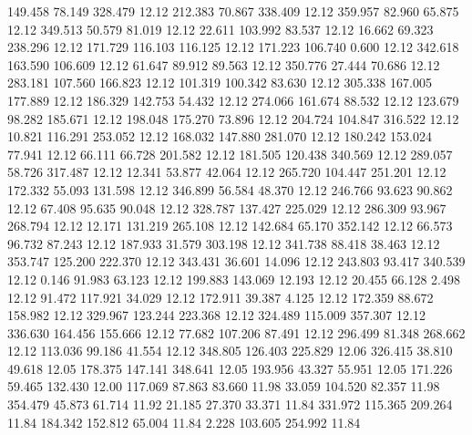  149.458   78.149  328.479        12.12
 212.383   70.867  338.409        12.12
 359.957   82.960   65.875        12.12
 349.513   50.579   81.019        12.12
  22.611  103.992   83.537        12.12
  16.662   69.323  238.296        12.12
 171.729  116.103  116.125        12.12
 171.223  106.740    0.600        12.12
 342.618  163.590  106.609        12.12
  61.647   89.912   89.563        12.12
 350.776   27.444   70.686        12.12
 283.181  107.560  166.823        12.12
 101.319  100.342   83.630        12.12
 305.338  167.005  177.889        12.12
 186.329  142.753   54.432        12.12
 274.066  161.674   88.532        12.12
 123.679   98.282  185.671        12.12
 198.048  175.270   73.896        12.12
 204.724  104.847  316.522        12.12
  10.821  116.291  253.052        12.12
 168.032  147.880  281.070        12.12
 180.242  153.024   77.941        12.12
  66.111   66.728  201.582        12.12
 181.505  120.438  340.569        12.12
 289.057   58.726  317.487        12.12
  12.341   53.877   42.064        12.12
 265.720  104.447  251.201        12.12
 172.332   55.093  131.598        12.12
 346.899   56.584   48.370        12.12
 246.766   93.623   90.862        12.12
  67.408   95.635   90.048        12.12
 328.787  137.427  225.029        12.12
 286.309   93.967  268.794        12.12
  12.171  131.219  265.108        12.12
 142.684   65.170  352.142        12.12
  66.573   96.732   87.243        12.12
 187.933   31.579  303.198        12.12
 341.738   88.418   38.463        12.12
 353.747  125.200  222.370        12.12
 343.431   36.601   14.096        12.12
 243.803   93.417  340.539        12.12
   0.146   91.983   63.123        12.12
 199.883  143.069   12.193        12.12
  20.455   66.128    2.498        12.12
  91.472  117.921   34.029        12.12
 172.911   39.387    4.125        12.12
 172.359   88.672  158.982        12.12
 329.967  123.244  223.368        12.12
 324.489  115.009  357.307        12.12
 336.630  164.456  155.666        12.12
  77.682  107.206   87.491        12.12
 296.499   81.348  268.662        12.12
 113.036   99.186   41.554        12.12
 348.805  126.403  225.829        12.06
 326.415   38.810   49.618        12.05
 178.375  147.141  348.641        12.05
 193.956   43.327   55.951        12.05
 171.226   59.465  132.430        12.00
 117.069   87.863   83.660        11.98
  33.059  104.520   82.357        11.98
 354.479   45.873   61.714        11.92
  21.185   27.370   33.371        11.84
 331.972  115.365  209.264        11.84
 184.342  152.812   65.004        11.84
   2.228  103.605  254.992        11.84
